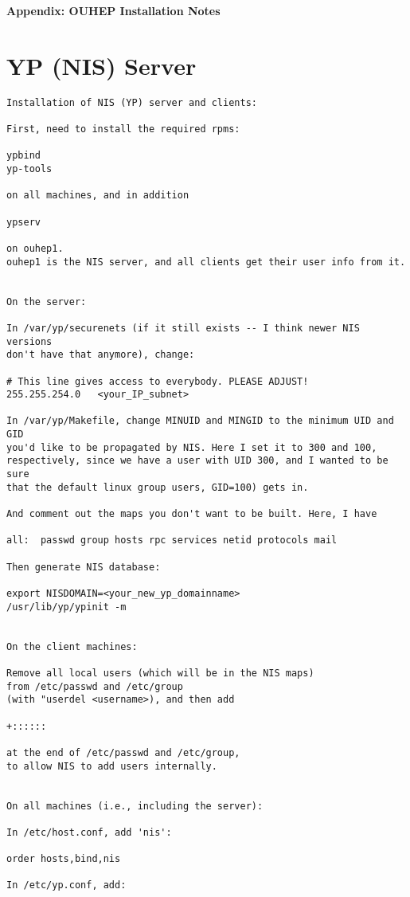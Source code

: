 \documentclass{revtex4}
\begin{document}
\begin{appendix}

{\Large \bf Appendix: OUHEP Installation Notes}

\section{YP (NIS) Server \label{nis}}
\begin{verbatim}
Installation of NIS (YP) server and clients:

First, need to install the required rpms:

ypbind
yp-tools

on all machines, and in addition

ypserv

on ouhep1. 
ouhep1 is the NIS server, and all clients get their user info from it.


On the server:

In /var/yp/securenets (if it still exists -- I think newer NIS versions 
don't have that anymore), change:

# This line gives access to everybody. PLEASE ADJUST!
255.255.254.0   <your_IP_subnet>

In /var/yp/Makefile, change MINUID and MINGID to the minimum UID and GID
you'd like to be propagated by NIS. Here I set it to 300 and 100, 
respectively, since we have a user with UID 300, and I wanted to be sure
that the default linux group users, GID=100) gets in.

And comment out the maps you don't want to be built. Here, I have

all:  passwd group hosts rpc services netid protocols mail

Then generate NIS database:

export NISDOMAIN=<your_new_yp_domainname>
/usr/lib/yp/ypinit -m


On the client machines:

Remove all local users (which will be in the NIS maps) 
from /etc/passwd and /etc/group
(with "userdel <username>), and then add

+::::::

at the end of /etc/passwd and /etc/group, 
to allow NIS to add users internally.


On all machines (i.e., including the server):

In /etc/host.conf, add 'nis':

order hosts,bind,nis

In /etc/yp.conf, add: 


\end{verbatim}
\end{appendix}
\end{document}
